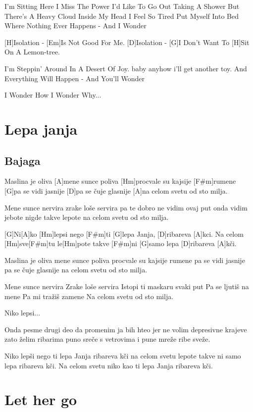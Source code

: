 \documentclass[a4paper,12pt]{article}
\begin{document}
\begin{multicols}{2}
\begin{guitar}
[Em Bm Em Bm Am Bm Em]


I'm Sitting Here I Miss The Power
I'd Like To Go Out Taking A Shower
But There's A Heavy Cloud Inside My Head
I Feel So Tired Put Myself Into Bed
Where Nothing Ever Happens - And I Wonder


[H]Isolation - [Em]Is Not Good For Me.
[D]Isolation - [G]I Don't Want To
[H]Sit On A Lemon-tree.


I'm Steppin' Around In A Desert Of Joy.
baby anyhow i'll get another toy.
And Everything Will Happen - And You'll Wonder


I Wonder How I Wonder Why...

\end{guitar}
\section{Lepa janja}
\subsection*{Bajaga}
\begin{guitar}
[D]Maslina je oliva [A]mene sunce poliva
[Hm]procvale su kajsije [F#m]rumene
[G]pa se vidi jasnije
[D]pa se čuje glasnije
[A]na celom svetu od sto milja.


Mene sunce nervira
zrake loše servira
pa te dobro ne vidim ovaj put
onda vidim jebote 
nigde takve lepote
na celom svetu od sto milja.


[G]Ni[A]ko [Hm]lepsi nego [F#m]ti
[G]lepa Janja, [D]ribareva [A]kci.
Na celom [Hm]sve[F#m]tu le[Hm]pote takve [F#m]ni
[G]samo lepa [D]ribareva [A]kči.


Maslina je oliva mene sunce poliva
procvale su kajsije rumene
pa se vidi jasnije
pa se čuje glasnije
na celom svetu od sto milja.


Mene sunce nervira
Zrake loše servira
Istopi ti maskaru svaki put
Pa se ljutiš na mene
Pa mi tražiš zamene
Na celom svetu od sto milja.
      

Niko lepsi...


Onda pesme drugi deo
da promenim ja bih hteo
jer ne volim depresivne krajeve
zato želim ribarima puno sreče s vetrovima
i pune mreže ribe sveže.


Niko lepši nego ti
lepa Janja ribareva kči
na celom svetu lepote takve ni
samo lepa ribareva kči.
Na celom svetu niko kao ti
lepa Janja ribareva kči. 

\end{guitar}
\section{Let her go}

\end{multicols}
\end{document}
